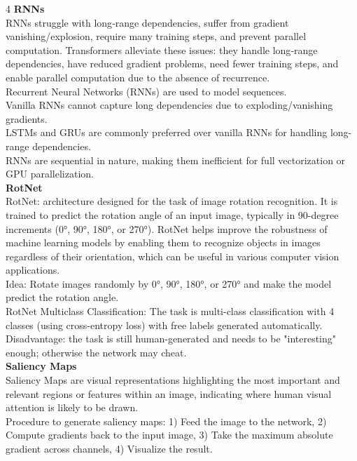 \documentclass[8pt]{extarticle}
\begin{document}
\begin{multicols}{4}
\vspace{2pt}\textbf{RNNs}\\
RNNs struggle with long‑range dependencies, suffer from gradient vanishing/explosion, require many training steps, and prevent parallel computation. Transformers alleviate these issues: they handle long‑range dependencies, have reduced gradient problems, need fewer training steps, and enable parallel computation due to the absence of recurrence.\\
Recurrent Neural Networks (RNNs) are used to model sequences.\\
Vanilla RNNs cannot capture long dependencies due to exploding/vanishing gradients.\\
LSTMs and GRUs are commonly preferred over vanilla RNNs for handling long-range dependencies.\\
RNNs are sequential in nature, making them inefficient for full vectorization or GPU parallelization.\\
\vspace{2pt}\textbf{RotNet}\\
RotNet: architecture designed for the task of image rotation recognition. It is trained to predict the rotation angle of an input image, typically in 90-degree increments (0°, 90°, 180°, or 270°). RotNet helps improve the robustness of machine learning models by enabling them to recognize objects in images regardless of their orientation, which can be useful in various computer vision applications.\\
Idea: Rotate images randomly by 0°, 90°, 180°, or 270° and make the model predict the rotation angle.\\
RotNet Multiclass Classification: The task is multi-class classification with 4 classes (using cross-entropy loss) with free labels generated automatically. Disadvantage: the task is still human-generated and needs to be "interesting" enough; otherwise the network may cheat.\\
\vspace{2pt}\textbf{Saliency Maps}\\
Saliency Maps are visual representations highlighting the most important and relevant regions or features within an image, indicating where human visual attention is likely to be drawn.\\
Procedure to generate saliency maps: 1) Feed the image to the network, 2) Compute gradients back to the input image, 3) Take the maximum absolute gradient across channels, 4) Visualize the result.\\

\end{multicols}
\end{document}
